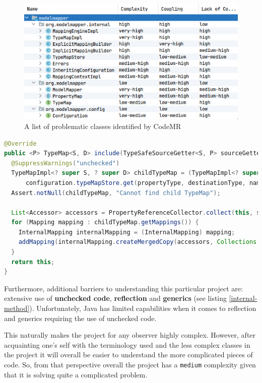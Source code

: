 \documentclass[12pt]{article}
\begin{document}
\begin{figure}[H]
    \centering
    \includegraphics[width=14cm]{images/problematic-classes.png}
    \caption{A list of problematic classes identified by CodeMR}
    \label{problematic-classes}
\end{figure}

\begin{lstlisting}[language=Java,label={internal-method},caption={An
internal method in the class \texttt{TypeMapImpl} which
was reported by CodeMR as having \texttt{very--high}
complexity}]
@Override
public <P> TypeMap<S, D> include(TypeSafeSourceGetter<S, P> sourceGetter, Class<P> propertyType) {
  @SuppressWarnings("unchecked")
  TypeMapImpl<? super S, ? super D> childTypeMap = (TypeMapImpl<? super S, ? super D>)
      configuration.typeMapStore.get(propertyType, destinationType, name);
  Assert.notNull(childTypeMap, "Cannot find child TypeMap");

  List<Accessor> accessors = PropertyReferenceCollector.collect(this, sourceGetter);
  for (Mapping mapping : childTypeMap.getMappings()) {
    InternalMapping internalMapping = (InternalMapping) mapping;
    addMapping(internalMapping.createMergedCopy(accessors, Collections.<PropertyInfo>emptyList()));
  }
  return this;
}
\end{lstlisting}

Furthermore, additional barriers to understanding this
particular project are: extensive use of \textbf{unchecked
code}, \textbf{reflection} and \textbf{generics} (see listing
\ref{internal-method}). Unfortunately, Java has limited
capabilities when it comes to reflection and generics requiring
the use of unchecked code.

This naturally makes the project for any observer highly
complex. However, after acquainting one's self with the
terminology used and the less complex classes in the project it
will overall be easier to understand the more complicated pieces
of code. So, from that perspective overall the project has a
\texttt{medium} complexity given that it is solving quite a
complicated problem. 
\end{document}
